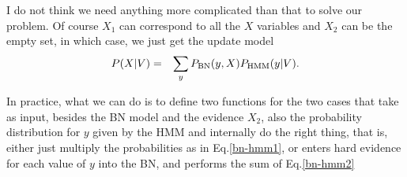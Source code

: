 \documentclass{article}
\begin{document}
I do not think we need anything more complicated than that to solve our problem.
Of course $X_1$ can correspond to all the $X$ variables and $X_2$ can be the empty set, in which case, we just get the update model
\begin{eqnarray}
P(X| V) &=& \sum_y P_{\mbox{\scriptsize BN}}(y,X)P_{\mbox{\scriptsize HMM}}(y|V).
\end{eqnarray}

In practice, what we can do is to define two functions for the two cases that take as input, besides the BN model and the evidence $X_2$, also the probability distribution for $y$ given by the HMM and internally do the right thing, that is, either just multiply the probabilities as in Eq.\ref{bn-hmm1}, or enters hard evidence for each value of $y$ into the BN, and performs the sum of Eq.\ref{bn-hmm2}
\end{document}

